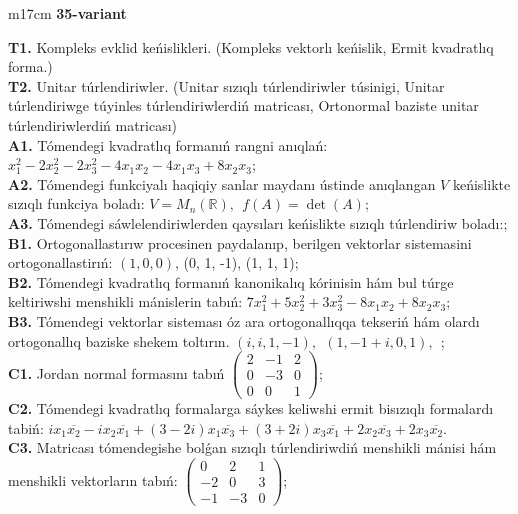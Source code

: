 \documentclass{article}
\begin{document}
\begin{tabular}{m{17cm}}
\textbf{35-variant}
\newline

\textbf{T1.} Kompleks evklid keńislikleri.  (Kompleks vektorlı keńislik, Ermit kvadratlıq forma.) \\
\textbf{T2.} Unitar túrlendiriwler. (Unitar sızıqlı túrlendiriwler túsinigi,  Unitar túrlendiriwge túyinles túrlendiriwlerdiń matricası,   Ortonormal baziste unitar túrlendiriwlerdiń matricası) \\
\textbf{A1.} Tómendegi kvadratlıq formanıń rangni anıqlań: \(x_{1}^{2} - 2x_{2}^{2} - 2x_{3}^{2} - 4x_{1}x_{2} - 4x_{1}x_{3} + 8x_{2}x_{3}\); \\
\textbf{A2.} Tómendegi funkciyalı haqiqiy sanlar maydanı ústinde anıqlangan \(V\) keńislikte sızıqlı funkciya boladı: \(V = M_{n}\left( \mathbb{R} \right),\ \ f(A) = \det(A)\); \\
\textbf{A3.} Tómendegi sáwlelendiriwlerden qaysıları keńislikte sızıqlı túrlendiriw boladı:; \\
\textbf{B1.} Ortogonallastırıw procesinen paydalanıp, berilgen vektorlar sistemasini ortogonallastirıń: \((1,0,0)\), (0, 1, -1), (1, 1, 1); \\
\textbf{B2.} Tómendegi kvadratlıq formanıń kanonikalıq kórinisin hám bul túrge keltiriwshi menshikli mánislerin tabıń: \(7x_{1}^{2} + 5x_{2}^{2} + 3x_{3}^{2} - 8x_{1}x_{2} + 8x_{2}x_{3}\); \\
\textbf{B3.} Tómendegi vektorlar sisteması óz ara ortogonallıqqa tekseriń hám olardı ortogonallıq baziske shekem toltırın. \((i,i,1, - 1),\ \ (1, - 1 + i,0,1),\ \ \); \\
\textbf{C1.} Jordan normal formasını tabıń \(\begin{pmatrix} 2 & - 1 & 2 \\ 0 & - 3 & 0 \\ 0 & 0 & 1 \end{pmatrix}\); \\
\textbf{C2.} Tómendegi kvadratlıq formalarga sáykes keliwshi ermit bisızıqlı formalardı tabiń: \(ix_{1}\overline{x_{2}} - ix_{2}\overline{x_{1}} + (3 - 2i)x_{1}\overline{x_{3}} + (3 + 2i)x_{3}\overline{x_{1}} + 2x_{2}\overline{x_{3}} + 2x_{3}\overline{x_{2}}\). \\
\textbf{C3.} Matricası tómendegishe bolǵan sızıqlı túrlendiriwdiń menshikli mánisi hám menshikli vektorların tabıń: \(\begin{pmatrix} 0 & 2 & 1 \\  - 2 & 0 & 3 \\  - 1 & - 3 & 0 \end{pmatrix}\); \\

\end{tabular}
\vspace{1cm}
\end{document}
